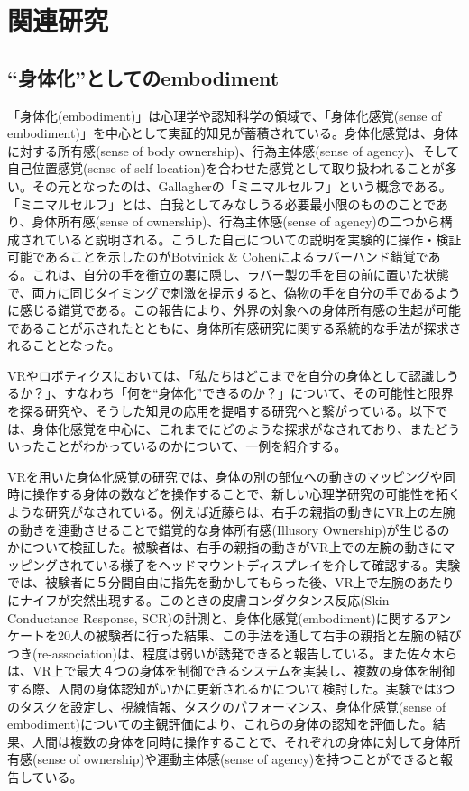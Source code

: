 \chapter{関連研究}
\label{related_works}

\section{``身体化''としてのembodiment}
「身体化(embodiment)」は心理学や認知科学の領域で、「身体化感覚(sense of embodiment)」を中心として実証的知見が蓄積されている。身体化感覚は、身体に対する所有感(sense of body ownership)、行為主体感(sense of agency)、そして自己位置感覚(sense of self-location)を合わせた感覚として取り扱われることが多い\cite{kilteni2012}。その元となったのは、Gallagherの「ミニマルセルフ」という概念である。「ミニマルセルフ」とは、自我としてみなしうる必要最小限のもののことであり、身体所有感(sense of ownership)、行為主体感(sense of agency)の二つから構成されていると説明される\cite{Gallagher2000}。こうした自己についての説明を実験的に操作・検証可能であることを示したのがBotvinick \& Cohenによるラバーハンド錯覚\cite{BotvinickCohen1998}である。これは、自分の手を衝立の裏に隠し、ラバー製の手を目の前に置いた状態で、両方に同じタイミングで刺激を提示すると、偽物の手を自分の手であるように感じる錯覚である。この報告により、外界の対象への身体所有感の生起が可能であることが示されたとともに、身体所有感研究に関する系統的な手法が探求されることとなった。

VRやロボティクスにおいては、「私たちはどこまでを自分の身体として認識しうるか？」、すなわち「何を``身体化''できるのか？」について、その可能性と限界を探る研究や、そうした知見の応用を提唱する研究へと繋がっている。以下では、身体化感覚を中心に、これまでにどのような探求がなされており、またどういったことがわかっているのかについて、一例を紹介する。

VRを用いた身体化感覚の研究では、身体の別の部位への動きのマッピングや同時に操作する身体の数などを操作することで、新しい心理学研究の可能性を拓くような研究がなされている。例えば近藤ら\cite{Kondo2020}は、右手の親指の動きにVR上の左腕の動きを連動させることで錯覚的な身体所有感(Illusory Ownership)が生じるのかについて検証した。被験者は、右手の親指の動きがVR上での左腕の動きにマッピングされている様子をヘッドマウントディスプレイを介して確認する。実験では、被験者に５分間自由に指先を動かしてもらった後、VR上で左腕のあたりにナイフが突然出現する。このときの皮膚コンダクタンス反応(Skin Conductance Response, SCR)の計測と、身体化感覚(embodiment)に関するアンケートを20人の被験者に行った結果、この手法を通して右手の親指と左腕の結びつき(re-association)は、程度は弱いが誘発できると報告している。また佐々木ら\cite{sasaki2022multisoma}は、VR上で最大４つの身体を制御できるシステムを実装し、複数の身体を制御する際、人間の身体認知がいかに更新されるかについて検討した。実験では3つのタスクを設定し、視線情報、タスクのパフォーマンス、身体化感覚(sense of embodiment)についての主観評価により、これらの身体の認知を評価した。結果、人間は複数の身体を同時に操作することで、それぞれの身体に対して身体所有感(sense of ownership)や運動主体感(sense of agency)を持つことができると報告している。

